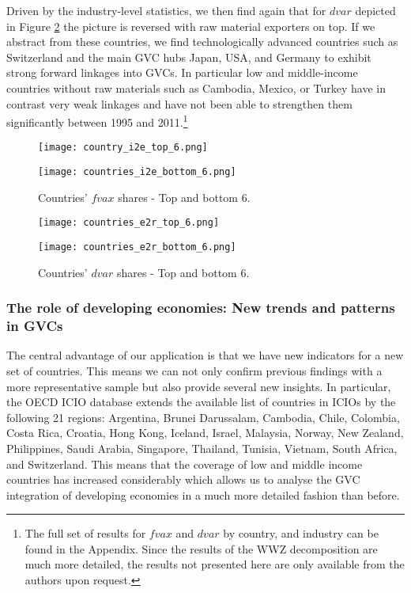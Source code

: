 \documentclass[a4paper,11pt]{article}
\begin{document}
Driven by the industry-level statistics, we then find again that for $dvar$ depicted in Figure \ref{fig:dvar_k} the picture is reversed with raw material exporters on top. If we abstract from these countries, we find technologically advanced countries such as Switzerland and the main GVC hubs Japan, USA, and Germany to exhibit strong forward linkages into GVCs. In particular low and middle-income countries without raw materials such as Cambodia, Mexico, or Turkey have in contrast very weak linkages and have not been able to strengthen them significantly between 1995 and 2011.\footnote{The full set of results for $fvax$ and $dvar$ by country, and industry can be found in the Appendix. Since the results of the WWZ decomposition are much more detailed, the results not presented here are only available from the authors upon request.}

\begin{figure}
\centering
\begin{minipage}{0.45\textwidth}
\centering
\texttt{[image: country\_i2e\_top\_6.png]}
\end{minipage}\hfill
\begin{minipage}{0.45\textwidth}
\centering
\texttt{[image: countries\_i2e\_bottom\_6.png]}
\end{minipage}
\caption{Countries' $fvax$ shares - Top and bottom 6.}
\label{fig:fvax_k}
\end{figure}

\begin{figure}
\centering
\begin{minipage}{0.45\textwidth}
\centering
\texttt{[image: countries\_e2r\_top\_6.png]}
\end{minipage}\hfill
\begin{minipage}{0.45\textwidth}
\centering
\texttt{[image: countries\_e2r\_bottom\_6.png]}
\end{minipage}
\caption{Countries' $dvar$ shares - Top and bottom 6.}
\label{fig:dvar_k}
\end{figure}



\subsubsection{The role of developing economies: New trends and patterns in GVCs}\label{sec:news}

The central advantage of our application is that we have new indicators for a new set of countries. This means we can not only confirm previous findings with a more representative sample but also provide several new insights. In particular, the OECD ICIO database extends the available list of countries in ICIOs by the following 21 regions: Argentina, Brunei Darussalam, Cambodia, Chile, Colombia, Costa Rica, Croatia, Hong Kong, Iceland, Israel, Malaysia, Norway, New Zealand, Philippines, Saudi Arabia, Singapore, Thailand, Tunisia, Vietnam, South Africa, and Switzerland. This means that the coverage of low and middle income countries has increased considerably which allows us to analyse the GVC integration of developing economies in a much more detailed fashion than before.
\end{document}
